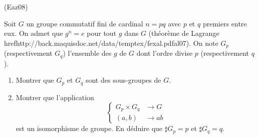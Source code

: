 \begin{tiny}(Eaz08)\end{tiny} Soit $G$ un groupe commutatif fini de cardinal $n=pq$ avec $p$ et $q$ premiers entre eux.
On admet que $g^n=e$ pour tout $g$ dans $G$ (théorème de Lagrange href{http://back.maquisdoc.net/data/temptex/fexal.pdf}{al07}). 
On note $G_p$ (respectivement  $G_q$) l'ensemble des $g$ de $G$ dont l'ordre divise $p$ (respectivement $q$).
\begin{enumerate}
 \item Montrer que $G_p$ et $G_q$ sont des sous-groupes de $G$.
 \item Montrer que l'application
\begin{displaymath}
 \left\lbrace
\begin{aligned}
 G_p\times G_q 	&\rightarrow G\\
 (a,b) &\rightarrow ab
\end{aligned}
 \right. 
\end{displaymath}
est un isomorphisme de groupe. En déduire que $\sharp G_p=p$ et $\sharp G_q = q$. 
\end{enumerate}
 
